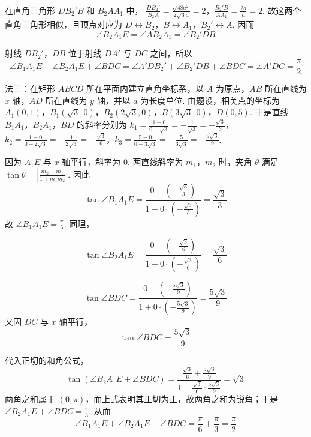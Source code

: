 \begin{solution}
在直角三角形 \(DB_2'B\) 和 \(B_2AA_1\) 中，
\(\frac{DB_2'}{B_2A}=\frac{\sqrt{48a^2}}{2\sqrt{3}a}=2\)，\(\frac{B_2'B}{AA_1}=\frac{2a}{a}=2\).
故这两个直角三角形相似，且顶点对应为 \(D\leftrightarrow B_2\)，\(B\leftrightarrow A_1\)，\(B_2'\leftrightarrow A\). 因而
\[
\angle B_2A_1E=\angle AB_2A_1=\angle B_2'DB
\]

射线 \(DB_2'\)，\(DB\) 位于射线 \(DA'\) 与 \(DC\) 之间，所以
\[
\angle B_1A_1E+\angle B_2A_1E+\angle BDC
=\angle A'DB_2'+\angle B_2'DB+\angle BDC
=\angle A'DC=\frac{\pi}{2}
\]

法三：在矩形 \(ABCD\) 所在平面内建立直角坐标系，以 \(A\) 为原点，\(AB\) 所在直线为 \(x\) 轴，\(AD\) 所在直线为 \(y\) 轴，并以 \(a\) 为长度单位. 由题设，相关点的坐标为 \(A_1\left(0,1\right)\)，\(B_1\left(\sqrt{3},0\right)\)，\(B_2\left(2\sqrt{3},0\right)\)，\(B\left(3\sqrt{3},0\right)\)，\(D\left(0,5\right)\). 于是直线 \(B_1A_1\)，\(B_2A_1\)，\(BD\) 的斜率分别为
\(k_1=\frac{1-0}{0-\sqrt{3}}=-\frac{1}{\sqrt{3}}=-\frac{\sqrt{3}}{3}\)，\(k_2=\frac{1-0}{0-2\sqrt{3}}=-\frac{1}{2\sqrt{3}}=-\frac{\sqrt{3}}{6}\)，\(k_3=\frac{5-0}{0-3\sqrt{3}}=-\frac{5}{3\sqrt{3}}=-\frac{5\sqrt{3}}{9}\).

因为 \(A_1E\) 与 \(x\) 轴平行，斜率为 \(0\). 两直线斜率为 \(m_1\)，\(m_2\) 时，夹角 \(\theta\) 满足 \(\tan\theta=\left|\frac{m_2-m_1}{1+m_1m_2}\right|\). 因此
\[
\tan\angle B_1A_1E
=\frac{0-\left( -\frac{\sqrt{3}}{3} \right)}{1+0\cdot\left( -\frac{\sqrt{3}}{3} \right)}
=\frac{\sqrt{3}}{3}
\]
故 \(\angle B_1A_1E=\frac{\pi}{6}\). 同理，

\[
\tan\angle B_2A_1E
=\frac{0-\left( -\frac{\sqrt{3}}{6} \right)}{1+0\cdot\left( -\frac{\sqrt{3}}{6} \right)}
=\frac{\sqrt{3}}{6}
\]

\[
\tan\angle BDC
=\frac{0-\left( -\frac{5\sqrt{3}}{9} \right)}{1+0\cdot\left( -\frac{5\sqrt{3}}{9} \right)}
=\frac{5\sqrt{3}}{9}
\]
又因 \(DC\) 与 \(x\) 轴平行，
\[
\tan\angle BDC=\frac{5\sqrt{3}}{9}
\]

代入正切的和角公式，
\[
\tan\left( \angle B_2A_1E+\angle BDC \right)
=\frac{\frac{\sqrt{3}}{6}+\frac{5\sqrt{3}}{9}}{1-\frac{\sqrt{3}}{6}\cdot\frac{5\sqrt{3}}{9}}
=\sqrt{3}
\]
两角之和属于 \((0,\pi)\)，而上式表明其正切为正，故两角之和为锐角；于是 \(\angle B_2A_1E+\angle BDC=\frac{\pi}{3}\). 从而
\[
\angle B_1A_1E+\angle B_2A_1E+\angle BDC
=\frac{\pi}{6}+\frac{\pi}{3}=\frac{\pi}{2}
\]
\end{solution}

